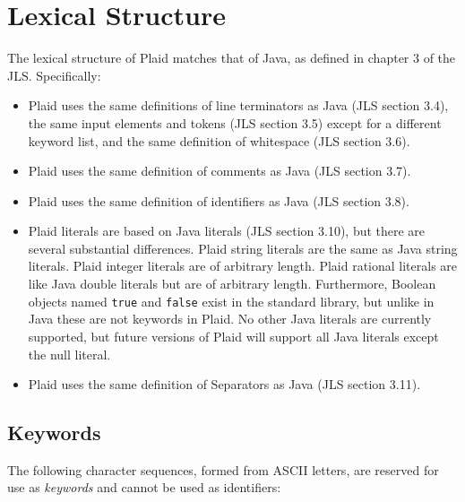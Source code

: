 \section{Lexical Structure}

The lexical structure of Plaid matches that of Java, as defined in
chapter 3 of the JLS.  Specifically:

\begin{itemize}

\item Plaid uses the same definitions of line terminators as Java (JLS
  section 3.4), the same input elements and tokens (JLS section 3.5)
  except for a different keyword list, and the same definition of
  whitespace (JLS section 3.6).

\item Plaid uses the same definition of comments as Java (JLS section 3.7).

\item Plaid uses the same definition of identifiers as Java (JLS section 3.8).

\item Plaid literals are based on Java literals (JLS section
3.10), but there are several substantial differences. Plaid 
string literals are the same as Java string literals. 
Plaid integer literals are of arbitrary length. Plaid 
rational literals are like Java double literals but are of 
arbitrary length. Furthermore, Boolean objects named 
\texttt{true} and \texttt{false} exist in the standard library,
but unlike in Java these are not keywords in Plaid. No other 
Java literals are currently supported, but future versions 
of Plaid will support all Java literals except the null literal.
  
\item Plaid uses the same definition of Separators as Java (JLS section 3.11).

\end{itemize}


\subsection{Keywords}

The following character sequences, formed from ASCII letters, are reserved
for use as \textit{keywords} and cannot be used as identifiers:

